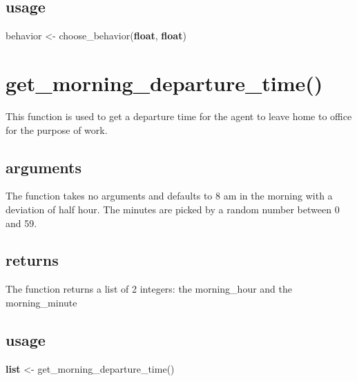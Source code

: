 \documentclass[]{book}
\newenvironment{Shaded}{\begin{snugshade}}{\end{snugshade}}
\newcommand{\KeywordTok}[1]{\textcolor[rgb]{0.13,0.29,0.53}{\textbf{#1}}}
\newcommand{\NormalTok}[1]{#1}
\newcommand{\OtherTok}[1]{\textcolor[rgb]{0.56,0.35,0.01}{#1}}
\theoremstyle{definition}
\theoremstyle{definition}
\theoremstyle{definition}
\theoremstyle{remark}
\begin{document}
\hypertarget{usage-3}{%
\subsection*{usage}\label{usage-3}}

\begin{Shaded}
\begin{Highlighting}[]
\NormalTok{behavior <- choose_behavior}\OtherTok{(}\KeywordTok{float}\OtherTok{,} \KeywordTok{float}\OtherTok{)}
\end{Highlighting}
\end{Shaded}

\hypertarget{get_morning_departure_time}{%
\section{get\_morning\_departure\_time()}\label{get_morning_departure_time}}

This function is used to get a departure time for the agent to leave
home to office for the purpose of work.

\hypertarget{arguments-4}{%
\subsection*{arguments}\label{arguments-4}}

The function takes no arguments and defaults to 8 am in the morning with
a deviation of half hour. The minutes are picked by a random number
between 0 and 59.

\hypertarget{returns-4}{%
\subsection*{returns}\label{returns-4}}

The function returns a list of 2 integers: the morning\_hour and the
morning\_minute

\hypertarget{usage-4}{%
\subsection*{usage}\label{usage-4}}

\begin{Shaded}
\begin{Highlighting}[]
\KeywordTok{list}\NormalTok{ <- get_morning_departure_time}\OtherTok{()}
\end{Highlighting}
\end{Shaded}
\end{document}
